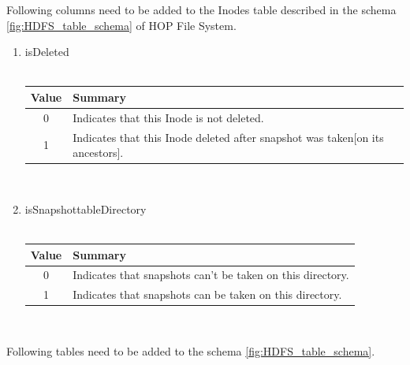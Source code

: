 Following columns need to be added to the Inodes table described in the schema \ref{fig:HDFS_table_schema} of HOP File System.
\begin{enumerate}
\item isDeleted \\\\
\begin{tabular}{|c|p{15cm}|}
\hline
Value&Summary\\
\hline
0&Indicates that this Inode is not deleted.\\
\hline
1&Indicates that this Inode deleted after snapshot was taken[on its ancestors].\\ 
\hline
\end{tabular} \\
\item isSnapshottableDirectory\\\\
\begin{tabular}{|c|p{15cm}|}
\hline
Value&Summary\\
\hline
0&Indicates that snapshots can't be taken on this directory.\\
\hline
1&Indicates that snapshots can be taken on this directory.\\ 
\hline
\end{tabular} \\
\end{enumerate}
Following tables need to be added to the schema \ref{fig:HDFS_table_schema}.
